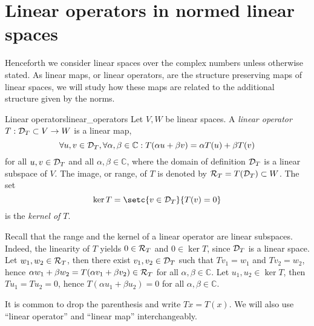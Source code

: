 \section{Linear operators in normed linear spaces}
Henceforth we consider linear spaces over the complex numbers unless otherwise stated. As linear maps, or linear operators, are the structure preserving maps of linear spaces, we will study how these maps are related to the additional structure given by the norms.
\begin{definition}{Linear operators}{linear_operators}
    Let \(V, W\) be linear spaces. A \emph{linear operator} \(T : \mathcal{D}_{T} \subset V \to W\) is a linear map,
    \begin{equation*}
        \forall u, v \in \domain{T}, \forall \alpha, \beta \in \mathbb{C}: %
        T(\alpha u + \beta v) = \alpha T(u) + \beta T(v)
    \end{equation*}
    for all \(u,v \in \mathcal{D}_{T}\) and all \(\alpha, \beta \in \mathbb{C}\), where the domain of definition \(\mathcal{D}_{T}\) is a linear subspace of \(V\). The image, or range, of \(T\) is denoted by \(\mathcal{R}_{T} = T(\mathcal{D}_{T}) \subset W\). The set
    \begin{equation*}
        \ker{T} = \setc{v \in \domain{T}}{T(v) = 0}
    \end{equation*}
    is the \emph{kernel of \(T\)}.
\end{definition}
\begin{remark}
    Recall that the range and the kernel of a linear operator are linear subspaces. Indeed, the linearity of \(T\) yields \(0 \in \mathcal{R}_{T}\) and \(0 \in \ker{T}\), since \(\mathcal{D}_{T}\) is a linear space. Let \(w_1, w_2 \in \mathcal{R}_{T}\), then there exist \(v_1, v_2 \in \mathcal{D}_{T}\) such that \(Tv_1 = w_1\) and \(Tv_2 = w_2\), hence \(\alpha w_1 + \beta w_2 = T(\alpha v_1 + \beta v_2) \in \mathcal{R}_{T}\) for all \(\alpha, \beta \in \mathbb{C}\). Let \(u_1, u_2 \in \ker{T}\), then \(Tu_1 = Tu_2 = 0\), hence \(T(\alpha u_1 + \beta u_2) = 0\) for all \(\alpha, \beta \in \mathbb{C}\).
\end{remark}
\begin{remark}
    It is common to drop the parenthesis and write \(Tx = T(x)\). We will also use \enquote{linear operator} and \enquote{linear map} interchangeably.
\end{remark}

